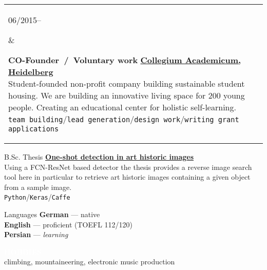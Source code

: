 \documentclass{article}
\newcommand{\cvsect}[1]{
	\vspace{0.5\baselineskip}
	\colorbox{primary}{\textcolor{white}{\MakeUppercase{\textbf{#1}}}}\\
}
\newenvironment{entrylist}{
	\begin{longtable}[H]{l l}
}{
	\end{longtable}
}
\newcommand{\entry}[4]{%
	\parbox[t]{0.175\linewidth}{#1} &
	\parbox[t]{0.825\linewidth}{
		\textbf{#2}%
		\hfill%
		{\footnotesize \textbf{\textcolor{black}{#3}}}\\%
		{\small #4} %
    }\\\\}
\newcommand{\slashsep}{\hspace{2mm}/\hspace{2mm}}
\begin{document}
\begin{entrylist}
    \entry
    {06/2015--}
    {CO-Founder\ /\ Voluntary work}
    {\href{https://collegiumacademicum.de}{Collegium Academicum, Heidelberg}}
    {
        Student-founded non-profit company building sustainable student housing.
        We are building an innovative living space for 200 young people.
        Creating an educational center for holistic self-learning.\\
        \texttt{team building}\slashsep\texttt{lead generation}\slashsep\texttt{design work}\slashsep\texttt{writing grant applications}
    }
\end{entrylist}

\begin{cvbox}{B.Sc. Thesis}
    \textbf{\href{https://github.com/morris-frank/ba_latex/blob/master/thesis.pdf}{One-shot detection in art historic images}}\\
    Using a FCN-ResNet based detector the thesis provides a reverse image search tool here in particular to retrieve art historic images containing a given object from a sample image.\\
    \texttt{Python}\slashsep\texttt{Keras}\slashsep\texttt{Caffe}\\

\end{cvbox}
\hfill
\begin{cvbox}{Languages}
	\textbf{German} --- native\\
	\textbf{English} --- proficient (TOEFL 112/120)\\
    \textbf{Persian} --- \textit{learning}

    \cvsect{Hobbies}

    climbing, mountaineering, electronic music production
\end{cvbox}
\hfill


\end{document}
